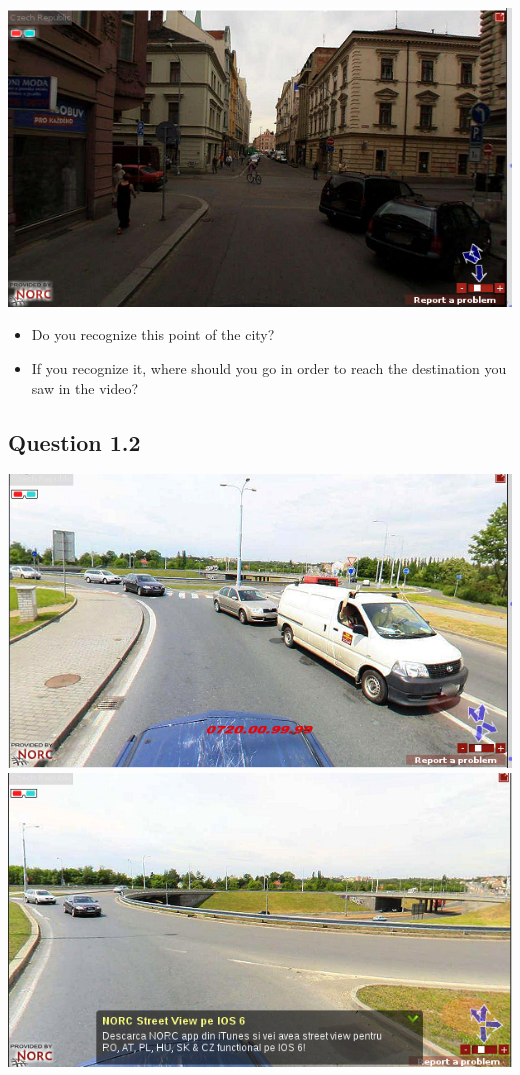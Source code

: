 \documentclass[12pt,a4paper,openright, notitlepage]{report}
\begin{document}
\includegraphics[width=\textwidth]{imgs/image-question11-2}

\begin{itemize}
	\item Do you recognize this point of the city?
	\item If you recognize it, where should you go in order to reach the destination you saw in the video?
\end{itemize}


\newpage

\subsection{Question 1.2}

\includegraphics[width=\textwidth]{imgs/image-question12-1}
\includegraphics[width=\textwidth]{imgs/image-question12-2}
\end{document}
